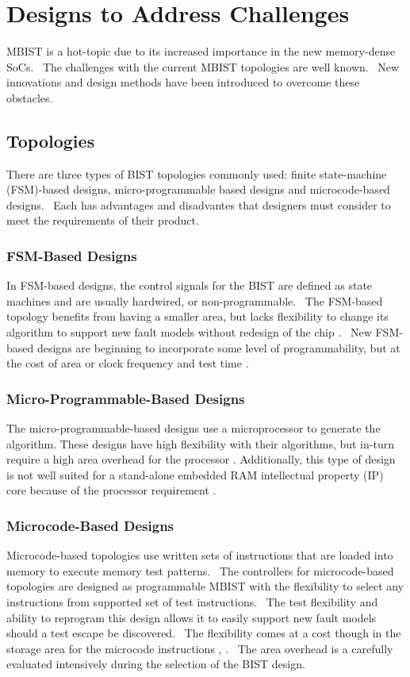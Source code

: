 \section{Designs to Address Challenges}
\label{sect:bg-designs}
MBIST is a hot-topic due to its increased importance in the new memory-dense SoCs.  The challenges with the current MBIST topologies are well known.  New innovations and design methods have been introduced to overcome these obstacles.

\subsection{Topologies}
There are three types of BIST topologies commonly used: finite state-machine (FSM)-based designs, micro-programmable based designs and microcode-based designs.  Each has advantages and disadvantes that designers must consider to meet the requirements of their product. 

\subsubsection{FSM-Based Designs}
In FSM-based designs, the control signals for the BIST are defined as state machines and are usually hardwired, or non-programmable.  The FSM-based topology benefits from having a smaller area, but lacks flexibility to change its algorithm to support new fault models without redesign of the chip \cite{5692281}.  New FSM-based designs are beginning to incorporate some level of programmability, but at the cost of area \cite{4815717} or clock frequency and test time \cite{748806}.

\subsubsection{Micro-Programmable-Based Designs}
The micro-programmable-based designs use a microprocessor to generate the algorithm.  These designs have high flexibility with their algorithms, but in-turn require a high area overhead for the processor \cite{726568}.  Additionally, this type of design is not well suited for a stand-alone embedded RAM intellectual property (IP) core because of the processor requirement \cite{1584083}.

\subsubsection{Microcode-Based Designs}
Microcode-based topologies use written sets of instructions that are loaded into memory to execute memory test patterns.  The controllers for microcode-based topologies are designed as programmable MBIST with the flexibility to select any instructions from supported set of test instructions.  The test flexibility and ability to reprogram this design allows it to easily support new fault models should a test escape be discovered.  The flexibility comes at a cost though in the storage area for the microcode instructions \cite{5692281}, \cite{114099}.  The area overhead is a carefully evaluated intensively during the selection of the BIST design. 

